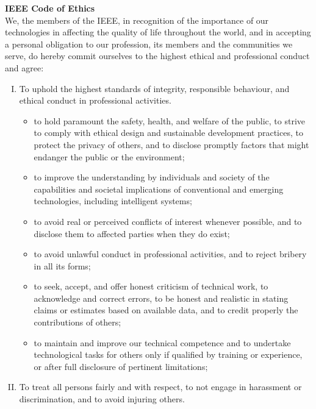 \newpage

\Large\textbf{IEEE Code of Ethics} \\
\normalsize
We, the members of the IEEE, in recognition of the importance of our technologies in affecting the quality of life throughout the world, and in accepting a personal obligation to our profession, its members and the communities we serve, do hereby commit ourselves to the highest ethical and professional conduct and agree:

\begin{enumerate}[I.]
    \item To uphold the highest standards of integrity, responsible behaviour, and ethical conduct in professional activities.
    \begin{itemize}

        \item to hold paramount the safety, health, and welfare of the public, to strive to comply with ethical design and sustainable development practices, to protect the privacy of others, and to disclose promptly factors that might endanger the public or the environment;
        
        \item to improve the understanding by individuals and society of the capabilities and societal implications of conventional and emerging technologies, including intelligent systems;
        
        \item to avoid real or perceived conflicts of interest whenever possible, and to disclose them to affected parties when they do exist;
        
        \item to avoid unlawful conduct in professional activities, and to reject bribery in all its forms;
        
        \item to seek, accept, and offer honest criticism of technical work, to acknowledge and correct errors, to be honest and realistic in stating claims or estimates based on available data, and to credit properly the contributions of others;
        
        \item to maintain and improve our technical competence and to undertake technological tasks for others only if qualified by training or experience, or after full disclosure of pertinent limitations;
    \end{itemize}
    \item To treat all persons fairly and with respect, to not engage in harassment or discrimination, and to avoid injuring others.
    \begin{itemize}
        

\end{itemize}
\end{enumerate}
